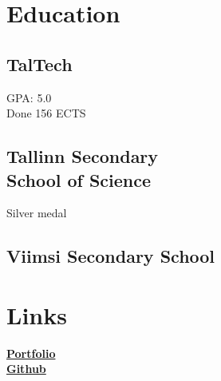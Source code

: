 \documentclass[letterpaper]{deedy-resume} %
\begin{document}
\begin{minipage}[t]{0.33\textwidth} %


\section{Education}

\subsection{TalTech}

GPA: 5.0 \\
Done 156 ECTS


\sectionspace %

\subsection{Tallinn Secondary \\School of Science}

Silver medal

\sectionspace %

\subsection{Viimsi Secondary School}

\sectionspace %


\section{Links}

\href{https://susiik.github.io/}{\bf Portfolio} \\
\href{https://github.com/susIik}{\bf Github} \\

\sectionspace %



\end{minipage}
\end{document}
